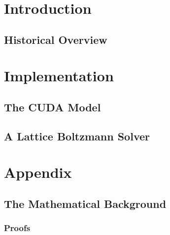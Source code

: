 \documentclass{tufte-book}
\begin{document}
\tableofcontents
\chapter{Introduction}
\section{Historical Overview}
\chapter{Implementation}
\section{The CUDA Model}
\section{A Lattice Boltzmann Solver}
\chapter*{Appendix}
\section*{The Mathematical Background}
\subsection*{Proofs}
\end{document}
